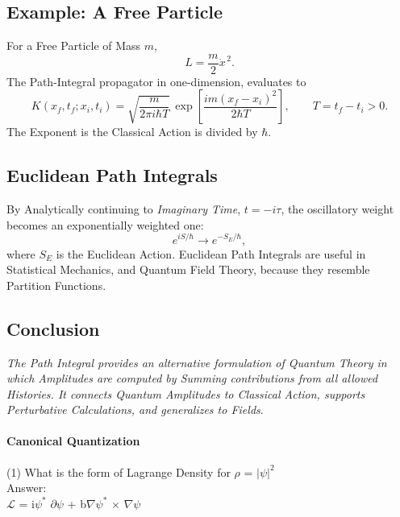 \documentclass[a4paper, 10pt, onepage]{elegantbook}
\begin{document}
\subsection{Example: A Free Particle}

For a Free Particle of Mass \(m\),
\[
L=\frac{m}{2}\dot{x}^{\,2}.
\]
The Path-Integral propagator in one-dimension, evaluates to
\[
K(x_f,t_f;x_i,t_i)
=
\sqrt{\frac{m}{2\pi i\hbar T}}\,
\exp\!\left[
\frac{i m(x_f-x_i)^2}{2\hbar T}
\right],
\qquad T=t_f-t_i>0.
\]
The Exponent is the Classical Action is divided by \(\hbar\).

\subsection{Euclidean Path Integrals}

By Analytically continuing to \emph{Imaginary Time}, \(t=-i\tau\), the oscillatory weight becomes an exponentially weighted one:
\[
e^{iS/\hbar}\longrightarrow e^{-S_E/\hbar},
\]
where \(S_E\) is the Euclidean Action. Euclidean Path Integrals are useful in Statistical Mechanics, and Quantum Field Theory, because
they resemble Partition Functions.

\subsection{Conclusion}

\emph{The Path Integral provides an alternative formulation of Quantum Theory in which Amplitudes are computed by Summing contributions from
all allowed Histories. It connects Quantum Amplitudes to Classical Action, supports Perturbative Calculations, and generalizes
to Fields}.







\paragraph{Canonical Quantization}
\label{para:Canonical Quantization}
\noindent

(1) What is the form of Lagrange Density for $\rho$ = $\lvert \psi \rvert^2$  \\

Answer:  \\

$\mathscr{L}$ = i$\psi^{*}$ $\partial \psi$ + b$\nabla \psi^{*}$ $\times$ $\nabla \psi$  \\
\end{document}

